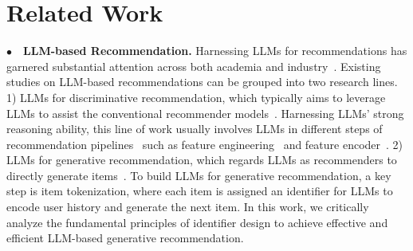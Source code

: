 \section{Related Work}\label{sec:related_work}

\noindent$\bullet\quad$\textbf{LLM-based Recommendation.} Harnessing LLMs for recommendations has garnered substantial attention across both academia and industry~\cite{sun2024large,zhang2024gpt4rec,fu2024iisan,zhang2024gpt4rec,shi2024large,zhao2024let,zheng2024harnessing,li2024large}. 
Existing studies on LLM-based recommendations can be grouped into two research lines. 
1) LLMs for discriminative recommendation, which typically aims to leverage LLMs to assist the conventional recommender models~\cite{wang2024reinforcement,ren2024enhancing,chen2024enhancing,wu2024coral}.                     
Harnessing LLMs' strong reasoning ability, this line of work usually involves LLMs in different steps of recommendation pipelines~\cite{lin2023can,zhang2024agentcf,zhang2024generative,wang2024automated} such as feature engineering~\cite{xi2024towards,ren2024representation,xi2024towards} and feature encoder~\cite{chen2024hllm}. 
2) LLMs for generative recommendation, which regards LLMs as recommenders to directly generate items~\cite{liao2024llara,kim2024large,lin2024bridging,wang2024eager,li2024large}. 
To build LLMs for generative recommendation, a key step is item tokenization, where each item is assigned an identifier for LLMs to encode user history and generate the next item. 
In this work, we critically analyze the fundamental principles of identifier design to achieve effective and efficient LLM-based generative recommendation. 

